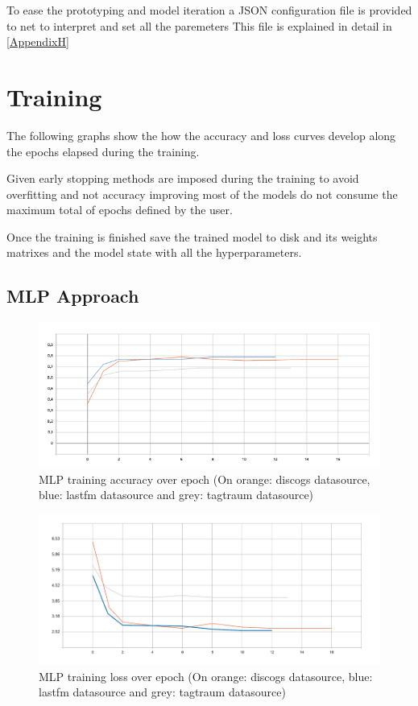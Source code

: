 To ease the prototyping and model iteration a JSON configuration file is provided to net to interpret and set all the paremeters
This file is explained in detail in \ref{AppendixH}

\section{Training}
\label{training phase}
The following graphs show the how the accuracy and loss curves develop along the epochs elapsed during the training.

Given early stopping methods are imposed during the training to avoid overfitting and not accuracy improving most of the models do not consume the maximum total of epochs defined by the user.

Once the training is finished save the trained model to disk and its weights matrixes and the model state with all the hyperparameters.

\subsection{MLP Approach}
\begin{figure}[th]
    \centering
    \includegraphics[width=1.0\textwidth]{Figures/training_acc.PNG}
    \decoRule
    \caption[MLP training accuracy]{MLP training accuracy over epoch (On orange: discogs datasource, blue: lastfm datasource and grey: tagtraum datasource)}
    \label{fig:MLP training accuracy}
\end{figure}

\begin{figure}[th]
    \centering
    \includegraphics[width=1.0\textwidth]{Figures/training_loss.PNG}
    \decoRule
    \caption[MLP training loss]{MLP training loss over epoch (On orange: discogs datasource, blue: lastfm datasource and grey: tagtraum datasource)}
    \label{fig:MLP training loss}
\end{figure}

